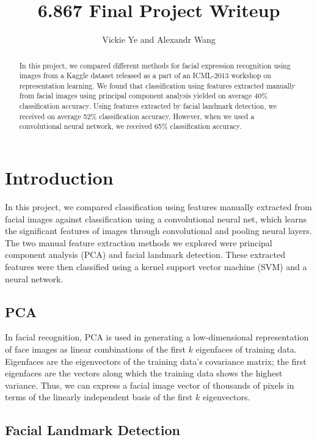 \documentclass[11pt, twocolumn, twoside]{article}
\title{6.867 Final Project Writeup} %
\date{}
\author {Vickie Ye and Alexandr Wang}
\begin{document}
\maketitle


\begin{abstract}
In this project, we compared different methods for facial expression recognition
using images from a Kaggle dataset released as a part of an ICML-2013 workshop
on representation learning.
We found that classification using features extracted manually from facial images
using principal component analysis yielded on average 40\% classification accuracy.
Using features extracted by facial landmark detection, we received on average 52\%
classification accuracy. However, when we used a convolutional neural network, we
received 65\% classification accuracy.
\end{abstract}

\section{Introduction}

In this project, we compared classification using features manually extracted from
facial images against classification using a convolutional neural net, which learns
the significant features of images through convolutional and pooling neural layers.
The two manual feature extraction methods we explored were principal component
analysis (PCA) and facial landmark detection. These extracted features were then
classified using a kernel support vector machine (SVM) and a neural network.

\subsection{PCA}

In facial recognition, PCA is used in generating a low-dimensional representation of
face images as linear combinations of the first $k$ eigenfaces of training data.
Eigenfaces are the eigenvectors of the training data's covariance matrix; the first
eigenfaces are the vectors along which the training data shows the highest variance.
Thus, we can express a facial image vector of thousands of pixels in terms of
the linearly independent basis of the first $k$ eigenvectors. 

\subsection{Facial Landmark Detection}
\end{document}
